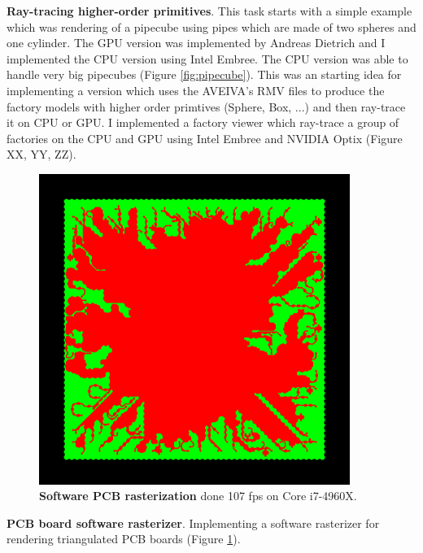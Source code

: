 \documentclass[]{report}
\begin{document}
\textbf{Ray-tracing higher-order primitives}. This task starts with a simple example which was rendering of a pipecube using pipes which are made of two spheres and one cylinder. The GPU version was implemented by Andreas Dietrich and I implemented the CPU version using Intel Embree. The CPU version was able to handle very big pipecubes (Figure \ref{fig:pipecube}). This was an starting idea for implementing a version which uses the AVEIVA's RMV files to produce the factory models with higher order primtives (Sphere, Box, ...) and then ray-trace it on CPU or GPU. I implemented a factory viewer which ray-trace a group of factories on the CPU and GPU using Intel Embree and NVIDIA Optix (Figure XX, YY, ZZ).

\begin{figure}[!ht]
	\centering
	\includegraphics[width=0.90\textwidth]{./figs/rasterizer2D.png}
	\caption[PCB 2D Rasterization]{\textbf{Software PCB rasterization} done 107 fps on Core i7-4960X.}
	\label{fig:twodimRaster}
\end{figure}

\textbf{PCB board software rasterizer}. Implementing a software rasterizer for rendering triangulated PCB boards (Figure \ref{fig:twodimRaster}).
\end{document}
